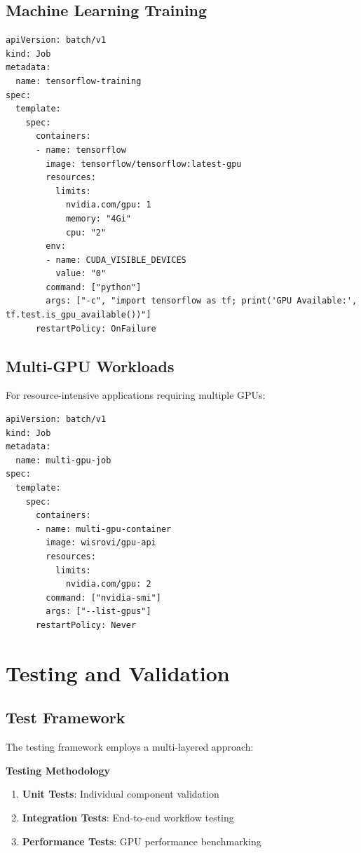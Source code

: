 \documentclass[12pt,a4paper]{report}
\begin{document}
\section{Machine Learning Training}
\begin{lstlisting}[caption=TensorFlow Training Job,label=lst:tf-training]
apiVersion: batch/v1
kind: Job
metadata:
  name: tensorflow-training
spec:
  template:
    spec:
      containers:
      - name: tensorflow
        image: tensorflow/tensorflow:latest-gpu
        resources:
          limits:
            nvidia.com/gpu: 1
            memory: "4Gi"
            cpu: "2"
        env:
        - name: CUDA_VISIBLE_DEVICES
          value: "0"
        command: ["python"]
        args: ["-c", "import tensorflow as tf; print('GPU Available:', tf.test.is_gpu_available())"]
      restartPolicy: OnFailure
\end{lstlisting}

\section{Multi-GPU Workloads}
For resource-intensive applications requiring multiple GPUs:

\begin{lstlisting}[caption=Multi-GPU Job,label=lst:multi-gpu]
apiVersion: batch/v1
kind: Job
metadata:
  name: multi-gpu-job
spec:
  template:
    spec:
      containers:
      - name: multi-gpu-container
        image: wisrovi/gpu-api
        resources:
          limits:
            nvidia.com/gpu: 2
        command: ["nvidia-smi"]
        args: ["--list-gpus"]
      restartPolicy: Never
\end{lstlisting}

\chapter{Testing and Validation}
\label{chap:testing}

\section{Test Framework}
The testing framework employs a multi-layered approach:

\begin{center}
\textbf{Testing Methodology}
\end{center}

\vspace{0.3cm}

\begin{enumerate}
    \item \textbf{Unit Tests}: Individual component validation
    \item \textbf{Integration Tests}: End-to-end workflow testing
    \item \textbf{Performance Tests}: GPU performance benchmarking
\end{enumerate}
\end{document}
